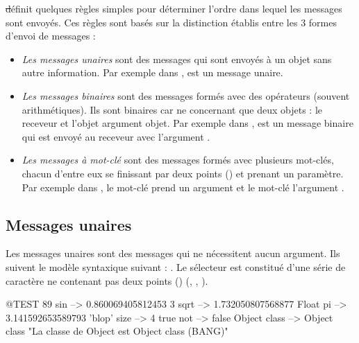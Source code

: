 \documentclass[a4paper,10pt,twoside]{book}
\begin{document}
\st d\'efinit quelques r\`egles simples pour d\'eterminer l'ordre dans lequel les messages sont envoy\'es. Ces r\`egles sont bas\'es sur la distinction \'etablis entre les 3 formes d'envoi de messages : 
\begin{itemize}
\item \emph{Les messages unaires} sont des messages qui sont envoy\'es \`a un objet sans autre information. Par exemple dans ,  est un message unaire. 
\item  \emph{Les messages binaires} sont des messages form\'es avec des op\'erateurs (souvent arithm\'etiques). Ils sont binaires car ne concernant que deux objets : le receveur et l'objet argument objet. Par exemple dans , \ct{+} est un message binaire qui est envoy\'e au receveur  avec l'argument . 
\item  \emph{Les messages \`a mot-cl\'e} sont des messages form\'es avec plusieurs mot-cl\'es, chacun d'entre eux se finissant par deux points (\ct{:}) et prenant un param\`etre.
Par exemple dans , le mot-cl\'e  prend un argument  et le mot-cl\'e  l'argument .
\end{itemize}

\subsection{Messages unaires}
Les messages unaires sont des messages qui ne n\'ecessitent aucun argument. Ils suivent le mod\`ele syntaxique suivant : . Le s\'electeur est constitu\'e d'une s\'erie de caract\`ere ne contenant pas deux points (\ct{:}) (\eg {}, , ).
\begin{code}{@TEST}
89 sin           --> 0.860069405812453
3 sqrt           --> 1.732050807568877
Float pi         --> 3.141592653589793
'blop' size     --> 4
true not        --> false
Object class --> Object class  "La classe de Object est Object class (BANG)"
\end{code}


\end{document}
